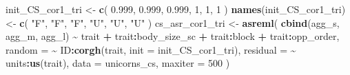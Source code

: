 \documentclass[
  12pt,
]{book}
\newenvironment{Shaded}{\begin{snugshade}}{\end{snugshade}}
\newcommand{\DataTypeTok}[1]{\textcolor[rgb]{0.13,0.29,0.53}{#1}}
\newcommand{\DecValTok}[1]{\textcolor[rgb]{0.00,0.00,0.81}{#1}}
\newcommand{\FloatTok}[1]{\textcolor[rgb]{0.00,0.00,0.81}{#1}}
\newcommand{\KeywordTok}[1]{\textcolor[rgb]{0.13,0.29,0.53}{\textbf{#1}}}
\newcommand{\NormalTok}[1]{#1}
\newcommand{\OperatorTok}[1]{\textcolor[rgb]{0.81,0.36,0.00}{\textbf{#1}}}
\newcommand{\StringTok}[1]{\textcolor[rgb]{0.31,0.60,0.02}{#1}}
\begin{document}
\begin{Shaded}
\begin{Highlighting}[]
\NormalTok{init\_CS\_cor1\_tri \textless{}{-}}\StringTok{ }\KeywordTok{c}\NormalTok{(}
  \FloatTok{0.999}\NormalTok{,}
  \FloatTok{0.999}\NormalTok{, }\FloatTok{0.999}\NormalTok{,}
  \DecValTok{1}\NormalTok{, }\DecValTok{1}\NormalTok{, }\DecValTok{1}
\NormalTok{)}
\KeywordTok{names}\NormalTok{(init\_CS\_cor1\_tri) \textless{}{-}}\StringTok{ }\KeywordTok{c}\NormalTok{(}
  \StringTok{"F"}\NormalTok{,}
  \StringTok{"F"}\NormalTok{, }\StringTok{"F"}\NormalTok{,}
  \StringTok{"U"}\NormalTok{, }\StringTok{"U"}\NormalTok{, }\StringTok{"U"}
\NormalTok{)}
\NormalTok{cs\_asr\_cor1\_tri \textless{}{-}}\StringTok{ }\KeywordTok{asreml}\NormalTok{(}
  \KeywordTok{cbind}\NormalTok{(agg\_s, agg\_m, agg\_l) }\OperatorTok{\textasciitilde{}}\StringTok{ }\NormalTok{trait }\OperatorTok{+}\StringTok{ }\NormalTok{trait}\OperatorTok{:}\NormalTok{body\_size\_sc }\OperatorTok{+}
\StringTok{    }\NormalTok{trait}\OperatorTok{:}\NormalTok{block }\OperatorTok{+}
\StringTok{    }\NormalTok{trait}\OperatorTok{:}\NormalTok{opp\_order,}
  \DataTypeTok{random =} \OperatorTok{\textasciitilde{}}\StringTok{ }\NormalTok{ID}\OperatorTok{:}\KeywordTok{corgh}\NormalTok{(trait, }\DataTypeTok{init =}\NormalTok{ init\_CS\_cor1\_tri),}
\DataTypeTok{residual =} \OperatorTok{\textasciitilde{}}\StringTok{ }\NormalTok{units}\OperatorTok{:}\KeywordTok{us}\NormalTok{(trait),}
\DataTypeTok{data =}\NormalTok{ unicorns\_cs,}
\DataTypeTok{maxiter =} \DecValTok{500}
\NormalTok{)}
\end{Highlighting}
\end{Shaded}
\end{document}
